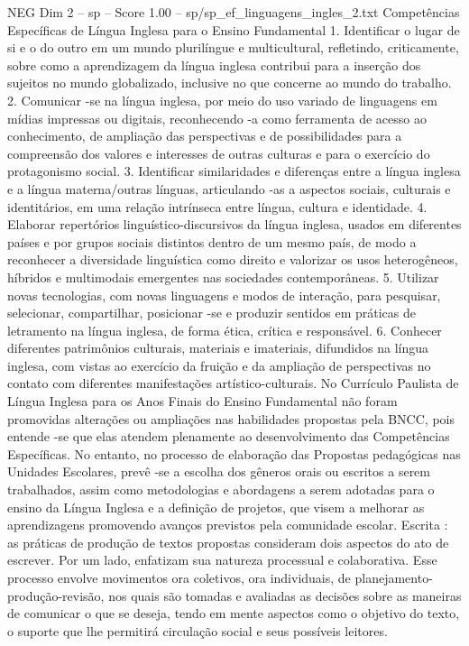 \begin{textsample}{NEG Dim 2 – sp – Score 1.00 – sp/sp\_ef\_linguagens\_ingles\_2.txt}  \label{ex:f2_neg_083}
Competências Específicas de Língua Inglesa para o Ensino Fundamental 1.
Identificar o lugar de si e o do outro em um mundo plurilíngue e multicultural, refletindo, criticamente, sobre como a aprendizagem da língua inglesa contribui para a inserção dos sujeitos no mundo globalizado, inclusive no que concerne ao mundo do trabalho. 2.
Comunicar -se na língua inglesa, por meio do uso variado de linguagens em mídias impressas ou digitais, reconhecendo -a como ferramenta de acesso ao conhecimento, de ampliação das perspectivas e de possibilidades para a compreensão dos valores e interesses de outras culturas e para o exercício do protagonismo social. 3.
Identificar similaridades e diferenças entre a língua inglesa e a língua materna/outras línguas, articulando -as a aspectos sociais, culturais e identitários, em uma relação intrínseca entre língua, cultura e identidade. 4.
Elaborar repertórios linguístico-discursivos da língua inglesa, usados em diferentes países e por grupos sociais distintos dentro de um mesmo país, de modo a reconhecer a diversidade linguística como direito e valorizar os usos heterogêneos, híbridos e multimodais emergentes nas sociedades contemporâneas. 5.
Utilizar novas tecnologias, com novas linguagens e modos de interação, para pesquisar, selecionar, compartilhar, posicionar -se e produzir sentidos em práticas de letramento na língua inglesa, de forma ética, crítica e responsável. 6.
Conhecer diferentes patrimônios culturais, materiais e imateriais, difundidos na língua inglesa, com vistas ao exercício da fruição e da ampliação de perspectivas no contato com diferentes manifestações artístico-culturais.
No Currículo Paulista de Língua Inglesa para os Anos Finais do Ensino Fundamental não foram promovidas alterações ou ampliações nas habilidades propostas pela BNCC, pois entende -se que elas atendem plenamente ao desenvolvimento das Competências Específicas.
No entanto, no processo de elaboração das Propostas pedagógicas nas Unidades Escolares, prevê -se a escolha dos gêneros orais ou escritos a serem trabalhados, assim como metodologias e abordagens a serem adotadas para o ensino da Língua Inglesa e a definição de projetos, que visem a melhorar as aprendizagens promovendo avanços previstos pela comunidade escolar.
Escrita : as práticas de produção de textos propostas consideram dois aspectos do ato de escrever.
Por um lado, enfatizam sua natureza processual e colaborativa.
Esse processo envolve movimentos ora coletivos, ora individuais, de planejamento-produção-revisão, nos quais são tomadas e avaliadas as decisões sobre as maneiras de comunicar o que se deseja, tendo em mente aspectos como o objetivo do texto, o suporte que lhe permitirá circulação social e seus possíveis leitores.

\end{textsample}
